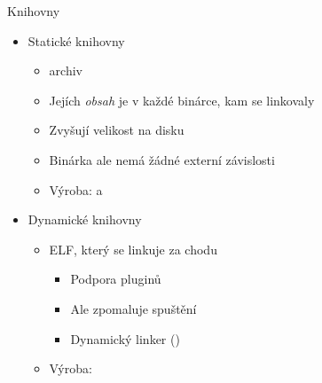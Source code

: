 
\begin{frame}{Knihovny}

  \begin{itemize}
    \item Statické knihovny
    \begin{itemize}
      \item {} archiv
      \item Jejích \emph{obsah} je v každé binárce, kam se linkovaly
      \item Zvyšují velikost na disku
      \item Binárka ale nemá žádné externí závislosti

      \pause

      \item Výroba:  a 
    \end{itemize}

    \pause

    \item Dynamické knihovny
    \begin{itemize}
      \item ELF, který se linkuje za chodu
      \begin{itemize}
	\item Podpora pluginů
	\item Ale zpomaluje spuštění

	\pause

	\item Dynamický linker  ()
      \end{itemize}

      \pause

      \item Výroba: 
    \end{itemize}

  \end{itemize}

\end{frame}

